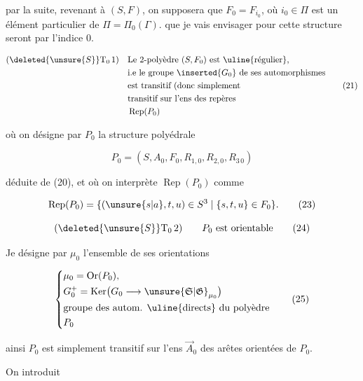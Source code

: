 par la suite, revenant à $(S,F)$, on supposera que $F_0=F_{i_0}$, où $i_0\in\Pi$ est un élément particulier de $\Pi=\Pi_0(\Gamma)$.  que je vais envisager pour cette structure seront  par l'indice $0$.

\[
\begin{aligned}
 (\deleted{\unsure{S}}\mathrm T_0\,1)\quad&\text{Le 2-polyèdre }(S,F_0)\text{ est \uline{régulier},}\\
 &\text{i.e le groupe }\inserted{G_0}\text{ de ses automorphismes}\\
 &\text{est transitif (donc simplement}\\
 &\text{transitif sur l'ens des repères}\\
 &\operatorname{Rep}(P_0)
\end{aligned}\tag*{(21)}
\]

où on désigne par $P_0$ la structure polyédrale

\[
P_0=(S,A_0,F_0,R_{1,0},R_{2,0},R_{3\,0})\tag*{(22)}
\]

déduite de (20), et où on interprète $\operatorname{Rep}(P_0)$ comme

\[
\operatorname{Rep}(P_0)=\{(\unsure{s|a},t,u)\in S^3\mid\{s,t,u\}\in F_0\}.\tag*{(23)}
\]

\[
(\deleted{\unsure{S}}\mathrm T_0\,2)\qquad P_0\text{ est orientable}\tag*{(24)}
\]


Je désigne par $\mu_0$ l'ensemble de ses orientations

\[
\left\{\begin{aligned}
 &\mu_0=\operatorname{Or}(P_0),\\
 &G_0^+=\operatorname{Ker}\bigl(G_0\longrightarrow\unsure{\mathfrak S|\mathfrak G}_{\mu_0}\bigr)\\
 &\text{groupe des autom. \uline{directs} du polyèdre}\\
 &P_0
\end{aligned}\right.\tag*{(25)}
\]

ainsi $P_0$ est simplement transitif sur l'ens $\vec A_0$ des arêtes orientées de $P_0$.

On introduit

